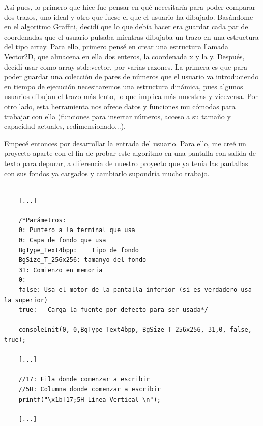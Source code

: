 Así pues, lo primero que hice fue pensar en qué necesitaría para poder comparar dos trazos, uno ideal y otro que fuese el que el usuario ha dibujado. Basándome en el algoritmo Graffiti, decidí que lo que debía hacer era guardar cada par de coordenadas que el usuario pulsaba mientras dibujaba un trazo en una estructura del tipo array. Para ello, primero pensé en crear una estructura llamada Vector2D, que almacena en ella dos enteros, la coordenada x y la y. Después, decidí usar como array std::vector, por varias razones. La primera es que para poder guardar una colección de pares de números que el usuario va introduciendo en tiempo de ejecución necesitaremos una estructura dinámica, pues algunos usuarios dibujan el trazo más lento, lo que implica más muestras y viceversa. Por otro lado, esta herramienta nos ofrece datos y funciones mu cómodas para trabajar con ella (funciones para insertar números, acceso a su tamaño y capacidad actuales, redimensionado...).

\vspace{0.5cm}

Empecé entonces por desarrollar la entrada del usuario. Para ello, me creé un proyecto aparte con el fin de probar este algoritmo en una pantalla con salida de texto para depurar, a diferencia de nuestro proyecto que ya tenía las pantallas con sus fondos ya cargados y cambiarlo supondría mucho trabajo.

\vspace{0.5cm}

\begin{lstlisting}[caption={Función consoleInit con los parámetros adecuados para crear un fondo que nos sirva para depurar}, label={code:consoleinit}]

    [...]
    
    /*Parámetros: 
    0: Puntero a la terminal que usa
    0: Capa de fondo que usa
    BgType_Text4bpp:	Tipo de fondo
    BgSize_T_256x256: tamanyo del fondo
    31: Comienzo en memoria
    0: 
    false: Usa el motor de la pantalla inferior (si es verdadero usa la superior)
    true:	Carga la fuente por defecto para ser usada*/

	consoleInit(0, 0,BgType_Text4bpp, BgSize_T_256x256, 31,0, false, true);
	
	[...]
	
	//17: Fila donde comenzar a escribir
	//5H: Columna donde comenzar a escribir
	printf("\x1b[17;5H Linea Vertical \n");
	
	[...]

\end{lstlisting}

